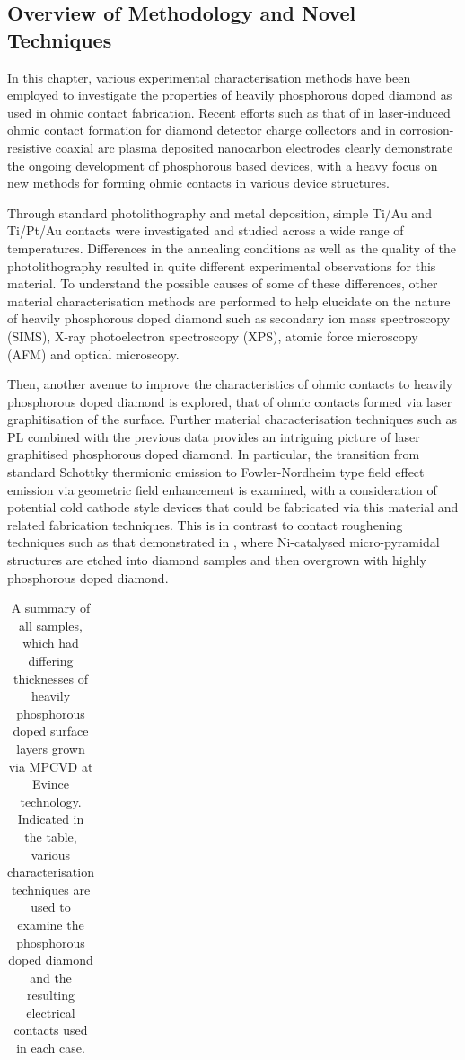 \begin{refsection}
\subsection{Overview of Methodology and Novel Techniques}
In this chapter, various experimental characterisation methods have been employed to investigate the properties of heavily phosphorous doped diamond as used in ohmic contact fabrication. Recent efforts such as that of \cite{abubakr2022} in laser-induced ohmic contact formation for diamond detector charge collectors and \cite{valappil2023} in corrosion-resistive coaxial arc plasma deposited nanocarbon electrodes clearly demonstrate the ongoing development of phosphorous based devices, with a heavy focus on new methods for forming ohmic contacts in various device structures.

Through standard photolithography and metal deposition, simple Ti/Au and Ti/Pt/Au contacts were investigated and studied across a wide range of temperatures. Differences in the annealing conditions as well as the quality of the photolithography resulted in quite different experimental observations for this material. To understand the possible causes of some of these differences, other material characterisation methods are performed to help elucidate on the nature of heavily phosphorous doped diamond such as secondary ion mass spectroscopy (SIMS), X-ray photoelectron spectroscopy (XPS), atomic force microscopy (AFM) and optical microscopy.

Then, another avenue to improve the characteristics of ohmic contacts to heavily phosphorous doped diamond is explored, that of ohmic contacts formed via laser graphitisation of the surface. Further material characterisation techniques such as PL combined with the previous data provides an intriguing picture of laser graphitised phosphorous doped diamond. In particular, the transition from standard Schottky thermionic emission to Fowler-Nordheim type field effect emission via geometric field enhancement is examined, with a consideration of potential cold cathode style devices that could be fabricated via this material and related fabrication techniques. This is in contrast to contact roughening techniques such as that demonstrated in \cite{temahuki2017}, where Ni-catalysed micro-pyramidal  structures are etched into  diamond samples and then overgrown with highly phosphorous doped diamond.

\begin{table}[h]
\centering
\caption{A summary of all  samples, which had differing thicknesses of heavily phosphorous doped surface layers grown via MPCVD at Evince technology. Indicated in the table, various characterisation techniques are used to examine the phosphorous doped diamond and the resulting electrical contacts used in each case.}
\label{table:samples_summary}
\begin{tabular}{|c|c|c|c|c|}


\end{tabular}
\end{table}
\end{refsection}
